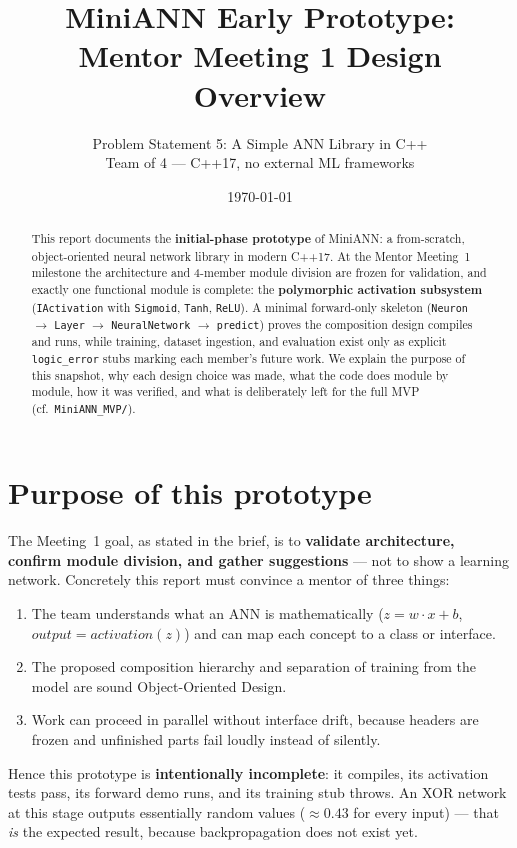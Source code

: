\documentclass[11pt,a4paper]{article}
\title{MiniANN Early Prototype: Mentor Meeting 1 Design Overview}
\author{Problem Statement 5: A Simple ANN Library in C++ \\ Team of 4 --- C++17, no external ML frameworks}
\date{\today}
\begin{document}
\maketitle

\begin{abstract}
This report documents the \textbf{initial-phase prototype} of MiniANN: a from-scratch,
object-oriented neural network library in modern C++17. At the Mentor Meeting~1 milestone
the architecture and 4-member module division are frozen for validation, and exactly one
functional module is complete: the \textbf{polymorphic activation subsystem}
(\texttt{IActivation} with \texttt{Sigmoid}, \texttt{Tanh}, \texttt{ReLU}).
A minimal forward-only skeleton (\texttt{Neuron} $\to$ \texttt{Layer} $\to$
\texttt{NeuralNetwork} $\to$ \texttt{predict}) proves the composition design compiles and runs,
while training, dataset ingestion, and evaluation exist only as explicit
\texttt{logic\_error} stubs marking each member's future work. We explain the purpose of this
snapshot, why each design choice was made, what the code does module by module, how it was
verified, and what is deliberately left for the full MVP (cf.\ \texttt{MiniANN\_MVP/}).
\end{abstract}

\tableofcontents
\newpage

\section{Purpose of this prototype}
The Meeting~1 goal, as stated in the brief, is to \textbf{validate architecture, confirm module
division, and gather suggestions} --- not to show a learning network. Concretely this report must
convince a mentor of three things:
\begin{enumerate}
  \item The team understands what an ANN is mathematically ($z = w\cdot x + b$,
    $\mathit{output}=\mathit{activation}(z)$) and can map each concept to a class or interface.
  \item The proposed composition hierarchy and separation of training from the model are sound
    Object-Oriented Design.
  \item Work can proceed in parallel without interface drift, because headers are frozen and
    unfinished parts fail loudly instead of silently.
\end{enumerate}
Hence this prototype is \textbf{intentionally incomplete}: it compiles, its activation tests pass,
its forward demo runs, and its training stub throws. An XOR network at this stage outputs
essentially random values ($\approx 0.43$ for every input) --- that \emph{is} the expected result,
because backpropagation does not exist yet.
\end{document}
